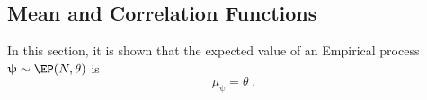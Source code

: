 \documentclass[12pt]{report}
\newcommand{\todolo}[1]{\todo[inline,color=green!50,linecolor=red]{#1}}
\begin{document}
%
%
%


\subsection{Mean and Correlation Functions} \label{app:E_EP}

In this section, it is shown that the expected value of an Empirical process $\uppsi \sim \EP(N, \theta)$ is 
\begin{equation}
\mu_{\uppsi} = \theta \;.
\end{equation}
\end{document}
